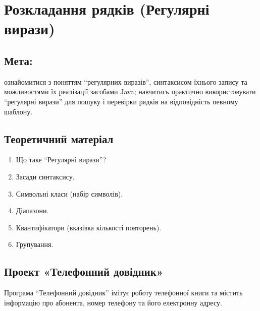 \section{Розкладання рядків (Регулярні вирази)}

\subsection{Мета:}
ознайомитися з поняттям “регулярних виразів”, синтаксисом їхнього запису та можливостями їх реалізації засобами Java; навчитись практично використовувати “регулярні вирази” для пошуку і перевірки рядків на відповідність певному шаблону.

\subsection{Теоретичний матеріал}

\begin{enumerate}
	\item Що таке “Регулярні вирази”?
	\item Засади синтаксису.
	\item Символьні класи (набір символів).
	\item Діапазони.
	\item Квантифікатори (вказівка кількості повторень).
	\item Групування.
\end{enumerate}

\subsection{Проект «Телефонний довідник»}

Програма “Телефонний довідник” імітує роботу телефонної книги та містить інформацію про абонента, номер телефону та його електронну адресу. 

